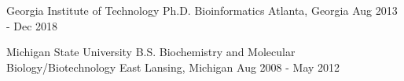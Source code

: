 \vspace{1.0mm}

\begin{cventries}

  \cventry
  	{Georgia Institute of Technology} %
    {Ph.D. Bioinformatics} %
    {Atlanta, Georgia} %
    {Aug 2013 - Dec 2018} %
    {}

\vspace{-1em}

  \cventry
  	{Michigan State University} %
    {B.S. Biochemistry and Molecular Biology/Biotechnology} %
    {East Lansing, Michigan} %
    {Aug 2008 - May 2012} %
    {}
	
\vspace{-2em}


\end{cventries}
